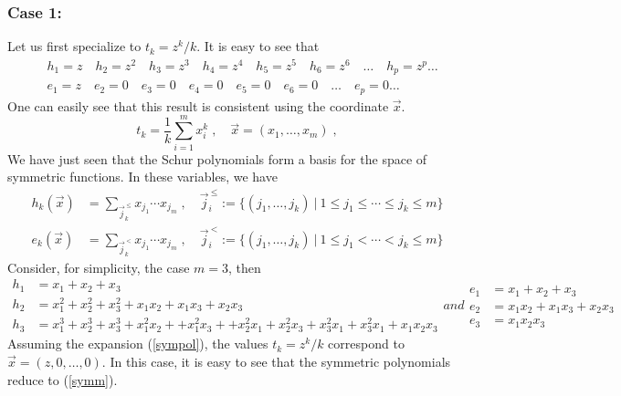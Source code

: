 \subsubsection{Case 1:} Let us first specialize to \(t_k=z^k/k\). It is easy to see that
\begin{equation}
\label{symm}
\begin{split}
  & h_1=z \quad h_2 = z^2 \quad  h_3 = z^3 \quad h_4 = z^4 \quad 
  h_5 = z^5 \quad h_6 = z^6\quad \dots\quad  h_p = z^p  \dots \\ 
  & e_1=z \quad e_2 = 0 \quad e_3 = 0 \quad e_4 = 0 \quad
  e_5 = 0 \quad e_6 = 0 \quad \dots \quad e_p = 0 \dots
\end{split}
\end{equation}
One can easily see that this result is consistent using the coordinate \(\vec{x}\). 
\begin{equation}
\label{sympol}
t_k = \frac{1}{k}\sum_{i=1}^m x_i^k \; , \quad \vec{x}=(x_1, \dots, x_m)\; ,
\end{equation}
We have just seen that the Schur polynomials form a basis for the space of
symmetric functions. In these variables, we have~\cite{Prasad2018}
\begin{equation}
\begin{split}
    h_k(\vec{x}) & = \sum_{\vec{j}_k^{\ \leq}} x_{j_1}\cdots x_{j_m}\; , \quad 
    \vec{j}_i^{\ \leq}:=\{ (j_1, \dots, j_k)\ |\ 1 \leq j_1\leq \cdots \leq j_k\leq m \}\\
    e_k(\vec{x}) & = \sum_{\vec{j}_k^{\ <}} x_{j_1}\cdots x_{j_m}\; , \quad 
    \vec{j}_i^{\ <}:=\{ (j_1, \dots, j_k)\ |\ 1 \leq j_1< \cdots < j_k\leq m \}
\end{split}
\end{equation}
Consider, for simplicity, the case \(m=3\), then
\begin{subequations} 
\begin{equation}
\begin{split} 
  h_1&  = x_1 + x_2 + x_3\\
  h_2&  = x^2_1 + x^2_2 + x^2_3+x_1 x_2 + x_1 x_3 + x_2 x_3\\
  h_3&  = x^3_1 + x^3_2 + x^3_3+x_1^2 x_2 + +x_1^2 x_3 + +x_2^2 x_1 + x_2^2 x_3 
  +x_3^2 x_1 +x_3^2 x_1 + x_1 x_2 x_3
\end{split}			
\end{equation}
and 
\begin{equation}
\begin{split} 
  e_1&  = x_1 + x_2 + x_3\\
  e_2&  = x_1 x_2 + x_1 x_3 + x_2 x_3\\
  e_3&  = x_1 x_2 x_3
\end{split}			
\end{equation}		
\end{subequations}
Assuming the expansion (\ref{sympol}), the values \(t_k=z^k/k\)
correspond to \(\vec{x} =(z, 0, \dots, 0)\). In this case, it is easy
to see that the symmetric polynomials reduce to (\ref{symm}).

